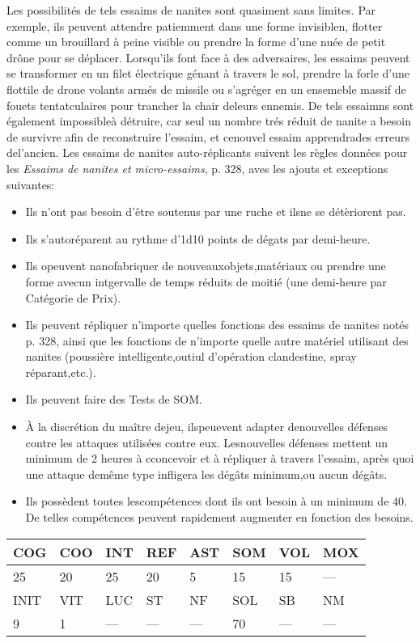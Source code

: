 Les possibilités de tels essaims de nanites sont quasiment sans limites. Par exemple, ils peuvent attendre patiemment dans une forme invisiblen, flotter comme un brouillard à peine visible ou prendre la forme d'une nuée de petit drône pour se déplacer. Lorsqu'ils font face à des adversaires, les essaims peuvent se transformer en un filet électrique génant à travers le sol, prendre la forle d'une flottile de drone volants armés de missile ou s'agréger en un ensemeble massif de fouets tentatculaires pour trancher la chair deleurs ennemis. De tels essaimns sont également impossibleà détruire, car seul un nombre trés réduit de nanite a besoin de survivre afin de reconstruire l'essaim, et cenouvel essaim apprendrades erreurs del'ancien. Les essaims de nanites auto-réplicants suivent les règles données pour les \textit{Essaims de nanites et micro-essaims}, p. 328, aves les ajouts et exceptions suivantes: 

\begin{itemize} \item Ils n'ont pas besoin d'être soutenus par une ruche et ilsne se détèriorent pas. \item Ils s'autoréparent au rythme d'1d10 points de dégats par demi-heure. \item Ils opeuvent nanofabriquer de nouveauxobjets,matériaux ou prendre une forme avecun intgervalle de temps réduits de moitié (une demi-heure par Catégorie de Prix). \item Ils peuvent répliquer n'importe quelles fonctions des essaims de nanites notés p. 328, ainsi que les fonctions de n'importe quelle autre matériel utilisant des nanites (poussière intelligente,outiul d'opération clandestine, spray réparant,etc.). \item Ils peuvent faire des Tests de SOM. \item À la discrétion du maître dejeu, ilspeuevent adapter denouvelles défenses contre les attaques utilisées contre eux. Lesnouvelles défenses mettent un minimum de 2 heures à cconcevoir et à répliquer à travers l'essaim, après quoi une attaque demême type infligera les dégâts minimum,ou aucun dégâts. \item Ils possèdent toutes lescompétences dont ils ont besoin à un minimum de 40. De telles compétences peuvent rapidement augmenter en fonction des besoins. \end{itemize} 

\begin{tabular}{|l|l|l|l|l|l|l|l|} \hline

COG &COO &INT &REF &AST &SOM &VOL &MOX \\ \hline

25 &20 &25 &20 &5 &15 &15 &— \\ \hline

INIT &VIT &LUC &ST &NF &SOL &SB &NM \\ \hline

9 &1 &— &— &— &70 &— &— \\ \hline

\end{tabular} 

